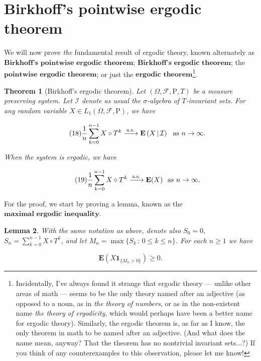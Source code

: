 \documentclass[11pt]{report}
\theoremstyle{plain}
\newtheorem{thm}{Theorem}[chapter]
\newtheorem{lem}[thm]{Lemma}
\theoremstyle{definition}
\begin{document}
\section{Birkhoff's pointwise ergodic theorem}

We will now prove \emph{the} fundamental result of ergodic
theory, known alternately as
$\textbf{Birkhoff's pointwise ergodic theorem}$;
$\textbf{Birkhoff's ergodic theorem}$; the
$\textbf{pointwise ergodic theorem}$; or just the
$\textbf{ergodic theorem}$\footnote{Incidentally, I've always found it strange that
ergodic theory --- unlike other areas of math ---
seems to be the only theory named after an adjective
(as opposed to a noun, as in \emph{the theory of numbers},
or as in the non-existent name \emph{the theory of
ergodicity}, which would perhaps have been a better
name for ergodic theory). Similarly, the ergodic
theorem is, as far as I know, the only theorem in math
to be named after an adjective. (And what does the
name mean, anyway? That the theorem has no nontrivial
invariant sets...?) If you think of any
counterexamples to this observation, please let me
know!}.

\begin{thm}[Birkhoff's ergodic theorem]
Let $(\Omega, \mathcal{F}, \mathrm{P}, T)$ be a
measure preserving system. Let $\mathcal{I}$ denote
as usual the $\sigma$-algebra of $T$-invariant sets.
For any random variable
$X \in L_1(\Omega, \mathcal{F}, \mathrm{P})$, we have

\begin{equation*} \tag{18}\label{eq:birkhoffergodic1}
\frac{1}{n} \sum_{k=0}^{n-1} X\circ T^k \xrightarrow[]{\textrm{\,a.s.\,}} \mathbf{E}\left(X\,|\,\mathcal{I}\right)\ \textrm{ as }n\to\infty.
\end{equation*}

\noindent When the system is ergodic, we have

\begin{equation*} \tag{19}\label{eq:birkhoffergodic2}
\frac{1}{n} \sum_{k=0}^{n-1} X\circ T^k \xrightarrow[]{\textrm{\,a.s.\,}} \mathbf{E}(X)\ \textrm{ as }n\to\infty.
\end{equation*}

\end{thm}

\noindent For the proof, we start by proving a lemma, known as
the $\textbf{maximal ergodic inequality}$.

\begin{lem}
\label{lem-ergodic-maximal}
With the same notation as above, denote also $S_0=0$,
$S_n  = \sum_{k=0}^{n-1} X\circ T^k$, and let
$M_n=\max\{ S_k \,:\,0\le k\le n\}$. For each $n\ge1$
we have

\[
\mathbf{E}(X \mathbf{1}_{\{M_n > 0 \}}) \ge 0.
\]

\end{lem}
\end{document}
